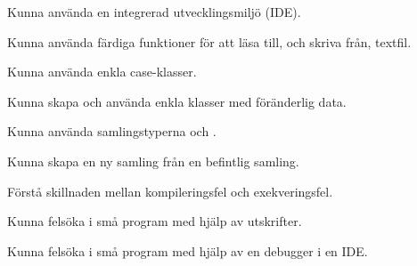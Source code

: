 
\item Kunna använda en integrerad utvecklingsmiljö (IDE).
\item Kunna använda färdiga funktioner för att läsa till, och skriva från, textfil.
\item Kunna använda enkla case-klasser.
\item Kunna skapa och använda enkla klasser med föränderlig data.
\item Kunna använda samlingstyperna  och .
\item Kunna skapa en ny samling från en befintlig samling.
\item Förstå skillnaden mellan kompileringsfel och exekveringsfel.
\item Kunna felsöka i små program med hjälp av utskrifter.
\item Kunna felsöka i små program med hjälp av en debugger i en IDE. 

